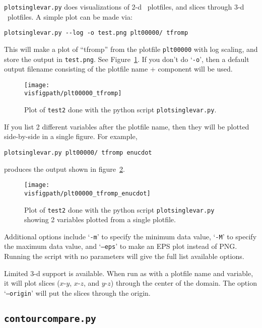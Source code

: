 {\tt plotsinglevar.py} does visualizations of 2-d \boxlib\ plotfiles,
and slices through 3-d \boxlib\ plotfiles.  A simple plot can be made
via:
\begin{verbatim}
plotsinglevar.py --log -o test.png plt00000/ tfromp
\end{verbatim}
This will make a plot of ``tfromp'' from the plotfile {\tt plt00000} with log scaling,
and store the output in {\tt test.png}.  See Figure~\ref{fig:python}.
If you don't do `{\tt -o}', then a default output filename consisting of the
plotfile name + component will be used.

\begin{figure}[t]
\centering
\texttt{[image: \\visfigpath/plt00000\_tfromp]}
\caption[Basic plot of {\tt test2} done with {\tt plotsinglevar.py}]
{\label{fig:python} Plot of {\tt test2} done with the python
  script {\tt plotsinglevar.py}.}
\end{figure}

If you list 2 different variables after the plotfile name, then they
will be plotted side-by-side in a single figure.  For example, 
\begin{verbatim}
plotsinglevar.py plt00000/ tfromp enucdot
\end{verbatim}
produces the output shown in figure~\ref{fig:python_two}.

\begin{figure}[t]
\centering
\texttt{[image: \\visfigpath/plt00000\_tfromp\_enucdot]}
\caption[Plot of two variables from {\tt test2} done with {\tt plotsinglevar.py}]
{\label{fig:python_two} Plot of {\tt test2} done with the
  python script {\tt plotsinglevar.py} showing 2 variables plotted
  from a single plotfile.}
\end{figure}


Additional options include `{\tt -m}' to specify the minimum data
value, `{\tt -M}' to specify the maximum data value, and `{\tt --eps}'
to make an EPS plot instead of PNG.  Running the script with no parameters
will give the full list available options.


Limited 3-d support is available.  When run as with a plotfile name
and variable, it will plot slices ($x$-$y$, $x$-$z$, and $y$-$z$) 
through the center of the domain.  The option `{\tt --origin}'
will put the slices through the origin.


\subsection{\tt contourcompare.py}

